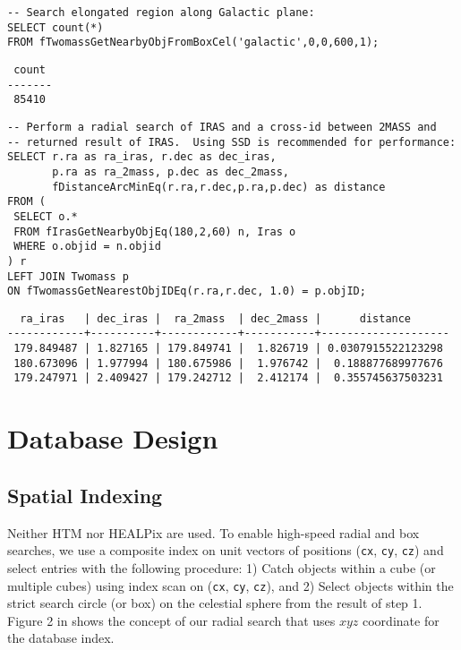 \begin{verbatim}
-- Search elongated region along Galactic plane:
SELECT count(*) 
FROM fTwomassGetNearbyObjFromBoxCel('galactic',0,0,600,1);
\end{verbatim}

{\small
\begin{verbatim}
 count 
-------
 85410
\end{verbatim}
}

{\small
\begin{verbatim}
-- Perform a radial search of IRAS and a cross-id between 2MASS and
-- returned result of IRAS.  Using SSD is recommended for performance:
SELECT r.ra as ra_iras, r.dec as dec_iras,
       p.ra as ra_2mass, p.dec as dec_2mass,
       fDistanceArcMinEq(r.ra,r.dec,p.ra,p.dec) as distance
FROM (
 SELECT o.*
 FROM fIrasGetNearbyObjEq(180,2,60) n, Iras o
 WHERE o.objid = n.objid
) r
LEFT JOIN Twomass p
ON fTwomassGetNearestObjIDEq(r.ra,r.dec, 1.0) = p.objID;
\end{verbatim}
}

{\small
\begin{verbatim}
  ra_iras   | dec_iras |  ra_2mass  | dec_2mass |      distance      
------------+----------+------------+-----------+--------------------
 179.849487 | 1.827165 | 179.849741 |  1.826719 | 0.0307915522123298
 180.673096 | 1.977994 | 180.675986 |  1.976742 |  0.188877689977676
 179.247971 | 2.409427 | 179.242712 |  2.412174 |  0.355745637503231
\end{verbatim}
}


\section{Database Design}

\subsection{Spatial Indexing}

Neither HTM \citep{kun_2000} nor HEALPix \citep{gor_2005} are used. To enable high-speed radial and box searches, we use a composite index on unit vectors of positions ({\tt cx}, {\tt cy}, {\tt cz}) and select entries with the following procedure: 1) Catch objects within a cube (or multiple cubes) using index scan on ({\tt cx}, {\tt cy}, {\tt cz}), and 2) Select objects within the strict search circle (or box) on the celestial sphere from the result of step 1. Figure 2 in \citet{yam_2011a} shows the concept of our radial search that uses $x$$y$$z$ coordinate for the database index.

